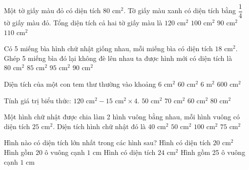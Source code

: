 \begin{ex} %
Một tờ giấy màu đỏ có diện tích $80\text{ cm}^2$. Tờ giấy màu xanh có diện tích bằng $\dfrac{1}{4}$ tờ giấy màu đỏ. Tổng diện tích cả hai tờ giấy màu là
\choice
{$120\text{ cm}^2$}
{\True $100\text{ cm}^2$}
{$90\text{ cm}^2$}
{$110\text{ cm}^2$}
\end{ex}

\begin{ex} %
Có 5 miếng bìa hình chữ nhật giống nhau, mỗi miếng bìa có diện tích $18\text{ cm}^2$. Ghép 5 miếng bìa đó lại không đè lên nhau ta được hình mới có diện tích là
\choice
{$80\text{ cm}^2$}
{$85\text{ cm}^2$}
{$95\text{ cm}^2$}
{\True $90\text{ cm}^2$}
\end{ex}

\begin{ex} %
Diện tích của một con tem thư thường vào khoảng
\choice
{\True $6\text{ cm}^2$}
{$60\text{ cm}^2$}
{$6\text{ m}^2$}
{$600\text{ cm}^2$}
\end{ex}

\begin{ex} %
Tính giá trị biểu thức: $120\text{ cm}^2 - 15\text{ cm}^2 \times 4$.
\choice
{$50\text{ cm}^2$}
{$70\text{ cm}^2$}
{\True $60\text{ cm}^2$}
{$80\text{ cm}^2$}
\end{ex}

\begin{ex} %
Một hình chữ nhật được chia làm 2 hình vuông bằng nhau, mỗi hình vuông có diện tích $25\text{ cm}^2$. Diện tích hình chữ nhật đó là
\choice
{$40\text{ cm}^2$}
{\True $50\text{ cm}^2$}
{$100\text{ cm}^2$}
{$75\text{ cm}^2$}
\end{ex}

\begin{ex} %
Hình nào có diện tích lớn nhất trong các hình sau?
\choice
{Hình có diện tích $20\text{ cm}^2$}
{Hình gồm 20 ô vuông cạnh $1\text{ cm}$}
{Hình có diện tích $24\text{ cm}^2$}
{\True Hình gồm 25 ô vuông cạnh $1\text{ cm}$}
\end{ex}

